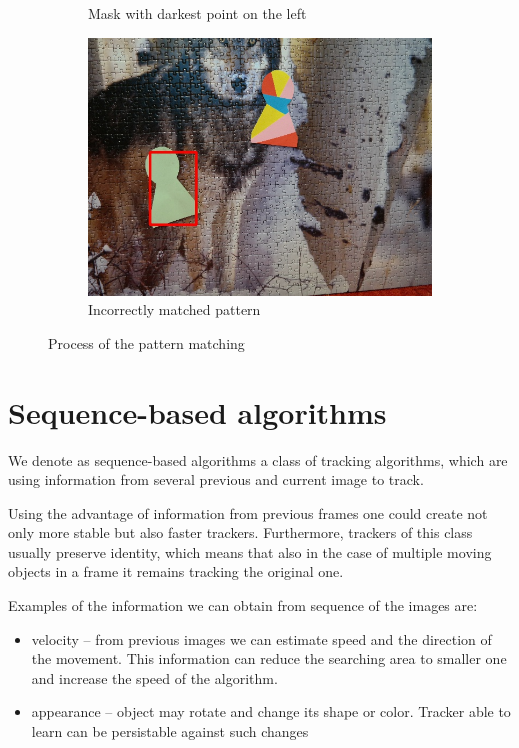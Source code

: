 \begin{figure}
\begin{subfigure}{0.48\linewidth}
    \caption{Mask with darkest point on the left}
  \end{subfigure}
  \begin{subfigure}{0.48\linewidth}
    \includegraphics[width=\linewidth]{img/pattern_matching/result-incorrect.jpg}
    \caption{Incorrectly matched pattern}
  \end{subfigure}
  \caption{Process of the pattern matching}
  \label{fig:pattern-matching-tracker}
\end{figure}



\section{Sequence-based algorithms}

We denote as sequence-based algorithms a class of tracking algorithms, which
are using information from several previous and current image to track.

Using the advantage of information from previous frames one could create not only
more stable but also faster trackers. Furthermore, trackers of this class usually preserve identity, which means
that also in the case of multiple moving objects in a frame it remains tracking the original
one.

Examples of the information we can obtain from sequence of the images are:
\begin{itemize}
\item velocity -- from previous images we can estimate speed and the direction of
  the movement. This information can reduce the searching area to smaller one
  and increase the speed of the algorithm.
\item appearance -- object may rotate and change its shape or color. Tracker able to
  learn can be persistable against such changes
\end{itemize}

